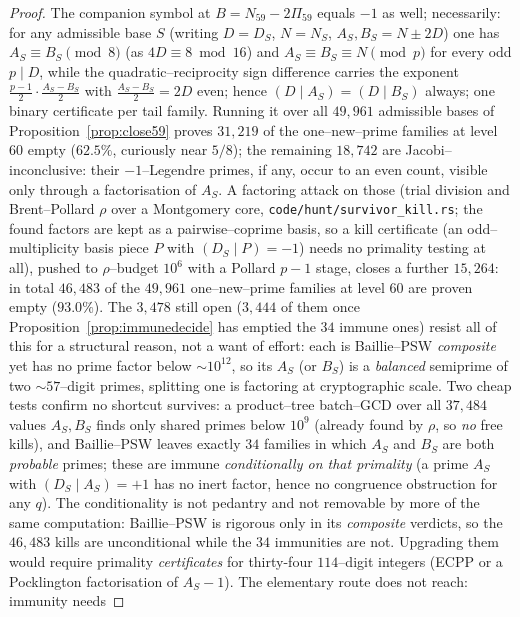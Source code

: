 \documentclass[11pt]{article}
\theoremstyle{definition}
\begin{document}
\begin{proof}
The companion symbol at $B=N_{59}-2\Pi_{59}$ equals $-1$ as well; necessarily: for any
admissible base $S$ (writing $D=D_S$, $N=N_S$, $A_S,B_S=N\pm2D$) one has $A_S\equiv B_S\pmod 8$
(as $4D\equiv8\bmod{16}$) and $A_S\equiv B_S\equiv N\pmod p$ for every odd $p\mid D$, while the
quadratic--reciprocity sign difference carries the exponent $\tfrac{p-1}{2}\cdot\tfrac{A_S-B_S}{2}$
with $\tfrac{A_S-B_S}{2}=2D$ even; hence $(D\mid A_S)=(D\mid B_S)$ always; one binary
certificate per tail family. Running it over all $49{,}961$ admissible bases of
Proposition~\ref{prop:close59} proves $31{,}219$ of the one--new--prime families at level $60$
empty ($62.5\%$, curiously near $5/8$); the remaining $18{,}742$ are Jacobi--inconclusive: their
$-1$--Legendre primes, if any, occur to an even count, visible only through a factorisation of
$A_S$. A factoring attack on those (trial division and Brent--Pollard $\rho$ over a Montgomery
core, \texttt{code/hunt/survivor\_kill.rs}; the found factors are kept as a pairwise--coprime basis, so
a kill certificate (an odd--multiplicity basis piece $P$ with $(D_S\mid P)=-1$) needs no
primality testing at all), pushed to $\rho$--budget $10^6$ with a Pollard $p-1$ stage, closes a
further $15{,}264$: in total $46{,}483$ of the $49{,}961$ one--new--prime families at level $60$
are proven empty ($93.0\%$). The $3{,}478$ still open ($3{,}444$ of them once
Proposition~\ref{prop:immunedecide} has emptied the $34$ immune ones) resist all of this for a
structural reason,
not a want of effort: each is Baillie--PSW \emph{composite} yet has no prime factor below ${\sim}
10^{12}$, so its $A_S$ (or $B_S$) is a \emph{balanced} semiprime of two ${\sim}57$--digit primes,
splitting one is factoring at cryptographic scale. Two cheap tests confirm no shortcut survives:
a product--tree batch--GCD over all $37{,}484$ values $A_S,B_S$ finds only shared primes below
$10^9$ (already found by $\rho$, so \emph{no} free kills), and Baillie--PSW leaves exactly
$34$ families in which $A_S$ and $B_S$ are both \emph{probable} primes; these are immune
\emph{conditionally on that primality} (a prime $A_S$ with $(D_S\mid A_S)=+1$ has no inert factor,
hence no congruence obstruction for any $q$). The conditionality is not pedantry and not
removable by more of the same computation: Baillie--PSW is rigorous only in its \emph{composite}
verdicts, so the $46{,}483$ kills are unconditional while the $34$ immunities are not. Upgrading them
would require primality \emph{certificates} for thirty-four $114$--digit integers (ECPP or a
Pocklington factorisation of $A_S-1$). The elementary route does not reach: immunity needs

\end{proof}
\end{document}
